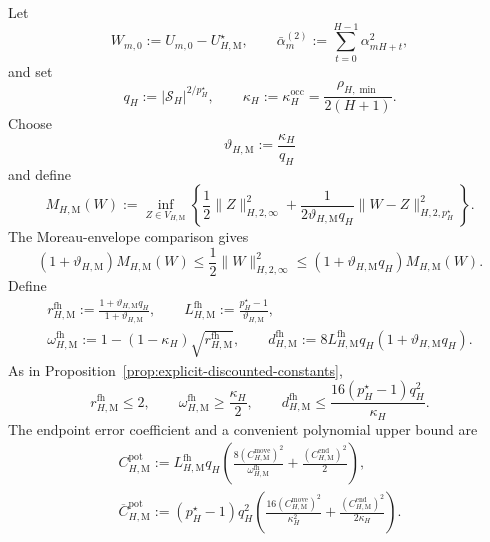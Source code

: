 \documentclass{article}
\begin{document}
Let
\begin{equation}
W_{m,0}:=U_{m,0}-U_{H,\mathrm M}^\star,\qquad \bar\alpha_m^{(2)}:=\sum_{t=0}^{H-1}\alpha_{mH+t}^2,
\end{equation}
and set
\begin{equation}
q_H:=\lvert\mathcal S_H\rvert^{2/p_H^\star},\qquad \kappa_H:=\kappa_H^{\mathrm{occ}}=\frac{\rho_{H,\min}}{2(H+1)}.
\end{equation}
Choose
\begin{equation}
\vartheta_{H,\mathrm M}:=\frac{\kappa_H}{q_H}
\end{equation}
and define
\begin{equation}
M_{H,\mathrm M}(W):=\inf_{Z\in V_{H,\mathrm M}}\left\{\frac{1}{2}\lVert Z\rVert_{H,2,\infty}^2+\frac{1}{2\vartheta_{H,\mathrm M}q_H}\lVert W-Z\rVert_{H,2,p_H^\star}^2\right\}.
\end{equation}
The Moreau-envelope comparison gives
\begin{equation}
(1+\vartheta_{H,\mathrm M})M_{H,\mathrm M}(W)\le\frac{1}{2}\lVert W\rVert_{H,2,\infty}^2\le(1+\vartheta_{H,\mathrm M}q_H)M_{H,\mathrm M}(W).
\end{equation}
Define
\begin{equation}
\begin{gathered}
r_{H,\mathrm M}^{\mathrm{fh}}:=\frac{1+\vartheta_{H,\mathrm M}q_H}{1+\vartheta_{H,\mathrm M}},\qquad
L_{H,\mathrm M}^{\mathrm{fh}}:=\frac{p_H^\star-1}{\vartheta_{H,\mathrm M}},\\
\omega_{H,\mathrm M}^{\mathrm{fh}}:=1-(1-\kappa_H)\sqrt{r_{H,\mathrm M}^{\mathrm{fh}}},\qquad
d_{H,\mathrm M}^{\mathrm{fh}}:=8L_{H,\mathrm M}^{\mathrm{fh}}q_H(1+\vartheta_{H,\mathrm M}q_H).
\end{gathered}
\end{equation}
As in Proposition~\ref{prop:explicit-discounted-constants},
\begin{equation}
r_{H,\mathrm M}^{\mathrm{fh}}\le2,\qquad
\omega_{H,\mathrm M}^{\mathrm{fh}}\ge\frac{\kappa_H}{2},\qquad
d_{H,\mathrm M}^{\mathrm{fh}}\le\frac{16(p_H^\star-1)q_H^2}{\kappa_H}.
\end{equation}
The endpoint error coefficient and a convenient polynomial upper bound are
\begin{equation}
\begin{gathered}
C_{H,\mathrm M}^{\mathrm{pot}}:=L_{H,\mathrm M}^{\mathrm{fh}}q_H\left(\frac{8(C_{H,\mathrm M}^{\mathrm{move}})^2}{\omega_{H,\mathrm M}^{\mathrm{fh}}}+\frac{(C_{H,\mathrm M}^{\mathrm{end}})^2}{2}\right),\\
\overline C_{H,\mathrm M}^{\mathrm{pot}}:=(p_H^\star-1)q_H^2\left(\frac{16(C_{H,\mathrm M}^{\mathrm{move}})^2}{\kappa_H^2}+\frac{(C_{H,\mathrm M}^{\mathrm{end}})^2}{2\kappa_H}\right).
\end{gathered}
\end{equation}
\end{document}
